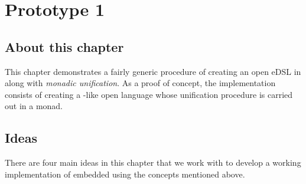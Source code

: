 \documentclass[thesis-solanki.tex]{subfiles}
\begin{document}
\chapter{Prototype 1}{\label{proto1}}



\section{About this chapter}

This chapter demonstrates a fairly generic procedure of creating an open eDSL in
 along with \textit{monadic unification}.
As a proof of concept, the implementation consists of creating a -like open language whose
unification procedure is carried out in a monad.


\section{Ideas}
There are four main ideas in this chapter that we work with to develop a working implementation of embedded
 using the concepts mentioned above.
\end{document}
